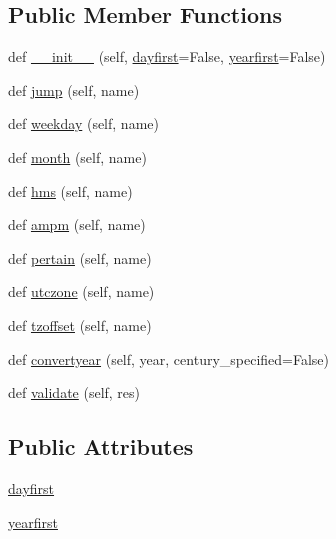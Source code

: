 \subsection*{Public Member Functions}
\begin{DoxyCompactItemize}
\item 
def \hyperlink{classdateutil_1_1parser_1_1__parser_1_1parserinfo_a82aa8563fed99fa894fe20080ca9787e}{\+\_\+\+\_\+init\+\_\+\+\_\+} (self, \hyperlink{classdateutil_1_1parser_1_1__parser_1_1parserinfo_ac35ec7dbbe713b82183242e0c91f98d3}{dayfirst}=False, \hyperlink{classdateutil_1_1parser_1_1__parser_1_1parserinfo_a7b45a99d2a9e4048daba50d1dec994b9}{yearfirst}=False)
\item 
def \hyperlink{classdateutil_1_1parser_1_1__parser_1_1parserinfo_aead5ebf0825b9692e45f832a2041ecae}{jump} (self, name)
\item 
def \hyperlink{classdateutil_1_1parser_1_1__parser_1_1parserinfo_abb78fa5fbe1706b8a10e6bc407f225d2}{weekday} (self, name)
\item 
def \hyperlink{classdateutil_1_1parser_1_1__parser_1_1parserinfo_ab5deeb1cebda47960c3c610e8ef5ec16}{month} (self, name)
\item 
def \hyperlink{classdateutil_1_1parser_1_1__parser_1_1parserinfo_ae6ca1eaf9c52f68e98c8ecf93c8e4096}{hms} (self, name)
\item 
def \hyperlink{classdateutil_1_1parser_1_1__parser_1_1parserinfo_a9042c9603ec027ebf88bf1be8efebf18}{ampm} (self, name)
\item 
def \hyperlink{classdateutil_1_1parser_1_1__parser_1_1parserinfo_ae400ebdab59da092890f17376a068989}{pertain} (self, name)
\item 
def \hyperlink{classdateutil_1_1parser_1_1__parser_1_1parserinfo_ace38812165af72764e4a7c21bc8ef77d}{utczone} (self, name)
\item 
def \hyperlink{classdateutil_1_1parser_1_1__parser_1_1parserinfo_a6087ed9f86b5d4467400a06389ba31c3}{tzoffset} (self, name)
\item 
def \hyperlink{classdateutil_1_1parser_1_1__parser_1_1parserinfo_a7771c28b564875d7069144cc8e3124b0}{convertyear} (self, year, century\+\_\+specified=False)
\item 
def \hyperlink{classdateutil_1_1parser_1_1__parser_1_1parserinfo_ac32b0d9509a19dc01a6f2c053af94919}{validate} (self, res)
\end{DoxyCompactItemize}
\subsection*{Public Attributes}
\begin{DoxyCompactItemize}
\item 
\hyperlink{classdateutil_1_1parser_1_1__parser_1_1parserinfo_ac35ec7dbbe713b82183242e0c91f98d3}{dayfirst}
\item 
\hyperlink{classdateutil_1_1parser_1_1__parser_1_1parserinfo_a7b45a99d2a9e4048daba50d1dec994b9}{yearfirst}
\end{DoxyCompactItemize}
